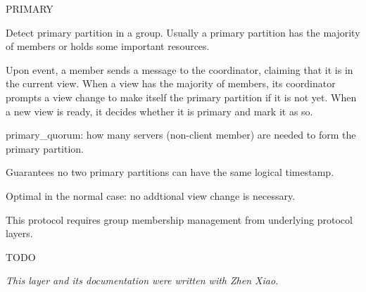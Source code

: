 \begin{Layer}{PRIMARY}

Detect primary partition in a group. Usually a primary partition has
the majority of members or holds some important resources.
\begin{Protocol}
Upon  event, a member sends a message to the coordinator,
claiming that it is in the current view. When a view has the majority
of members, its coordinator prompts a view change to make itself the
primary partition if it is not yet.  When a new view is ready, it
decides whether it is primary and mark it as so.
\end{Protocol}

\begin{Parameters}
\item primary\_quorum: how many servers (non-client member) are
needed to form the primary partition.
\end{Parameters}

\begin{Properties}
\item
Guarantees no two primary partitions can have the same logical timestamp.
\item
Optimal in the normal case: no addtional view change is necessary.
\item
This protocol requires group membership management from underlying
protocol layers. 
\end{Properties}

\begin{Sources}
\end{Sources}

\begin{GenEvent}
\end{GenEvent}

\begin{Testing}
\item
TODO
\end{Testing}

\emph{This layer and its documentation were written with Zhen Xiao.}
\end{Layer}
